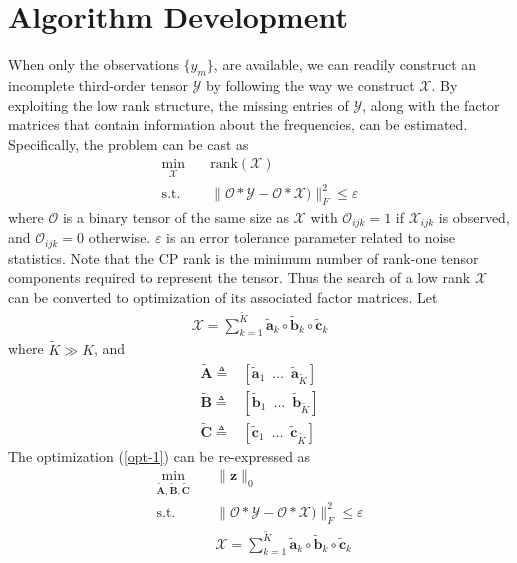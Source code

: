 \documentclass[10pt,journal,epsfig]{IEEEtran}
\begin{document}
\section{Algorithm Development}
When only the observations $\{y_m\}$, are available, we can
readily construct an incomplete third-order tensor
$\boldsymbol{\mathcal{Y}}$ by following the way we construct
$\boldsymbol{\mathcal{X}}$. By exploiting the low rank structure,
the missing entries of $\boldsymbol{\mathcal{Y}}$, along with the
factor matrices that contain information about the frequencies,
can be estimated. Specifically, the problem can be cast as
\begin{align}
\min_{\boldsymbol{\mathcal{X}}}&\quad
\text{rank}(\boldsymbol{\mathcal{X}}) \nonumber\\
\text{s.t.}&\quad
\|\boldsymbol{\mathcal{O}}\ast\boldsymbol{\mathcal{Y}}-
\boldsymbol{\mathcal{O}}\ast\boldsymbol{\mathcal{X}})\|_F^2\leq\varepsilon
\label{opt-1}
\end{align}
where $\boldsymbol{\mathcal{O}}$ is a binary tensor of the same
size as $\boldsymbol{\mathcal{X}}$ with $\mathcal{O}_{ijk}=1$ if
$\mathcal{X}_{ijk}$ is observed, and $\mathcal{O}_{ijk}=0$
otherwise. $\varepsilon$ is an error tolerance parameter related
to noise statistics. Note that the CP rank is the minimum number
of rank-one tensor components required to represent the tensor.
Thus the search of a low rank $\boldsymbol{\mathcal{X}}$ can be
converted to optimization of its associated factor matrices. Let
\begin{align}
\boldsymbol{\mathcal{X}}=\sum\limits_{k=1}^{\tilde{K}}\boldsymbol{\tilde{a}}_k\circ
\boldsymbol{\tilde{b}}_k\circ\boldsymbol{\tilde{c}}_k
\end{align}
where $\tilde{K}\gg K$, and
\begin{align}
\boldsymbol{\tilde{A}}\triangleq &
[\boldsymbol{\tilde{a}}_1\phantom{0}\ldots\phantom{0}\boldsymbol{\tilde{a}}_{\tilde{K}}]
\nonumber\\
\boldsymbol{\tilde{B}}\triangleq &
[\boldsymbol{\tilde{b}}_1\phantom{0}\ldots\phantom{0}\boldsymbol{\tilde{b}}_{\tilde{K}}]
\nonumber\\
\boldsymbol{\tilde{C}}\triangleq &
[\boldsymbol{\tilde{c}}_1\phantom{0}\ldots\phantom{0}\boldsymbol{\tilde{c}}_{\tilde{K}}]
\nonumber
\end{align}
The optimization (\ref{opt-1}) can be re-expressed as
\begin{align}
\min_{\boldsymbol{\tilde{A}},\boldsymbol{\tilde{B}},\boldsymbol{\tilde{C}}}&\quad
\|\boldsymbol{z}\|_0 \nonumber\\
\text{s.t.} &\quad
\|\boldsymbol{\mathcal{O}}\ast\boldsymbol{\mathcal{Y}}-
\boldsymbol{\mathcal{O}}\ast\boldsymbol{\mathcal{X}})\|_F^2\leq\varepsilon
\nonumber\\
&\quad
\boldsymbol{\mathcal{X}}=\sum\limits_{k=1}^{\tilde{K}}\boldsymbol{\tilde{a}}_k\circ
\boldsymbol{\tilde{b}}_k\circ\boldsymbol{\tilde{c}}_k
\label{opt-2}
\end{align}
\end{document}
